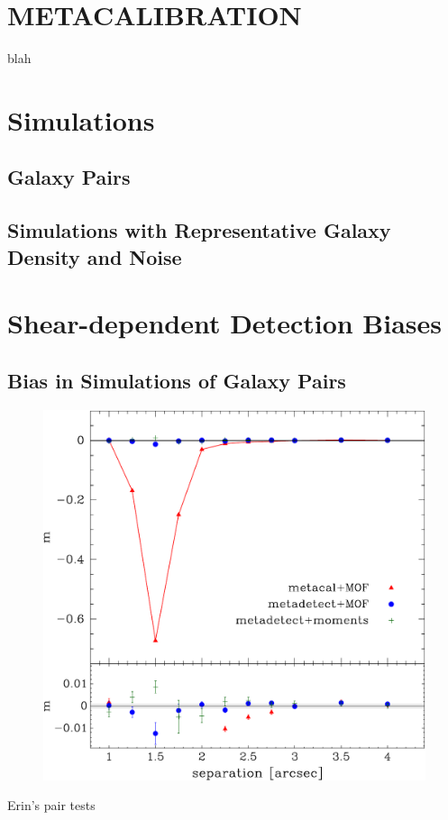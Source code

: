 \documentclass[fleqn,useAMS,usenatbib]{mnras}
\begin{document}
\section{\textsc{METACALIBRATION}}

blah

\section{Simulations}

\subsection{Galaxy Pairs}

\subsection{Simulations with Representative Galaxy Density and Noise}

\section{Shear-dependent Detection Biases}

\subsection{Bias in Simulations of Galaxy Pairs}

\begin{figure}
    \includegraphics[width=\columnwidth]{figures/pairs-mc-bdkpair.pdf}

\end{figure}
Erin's pair tests
\end{document}
